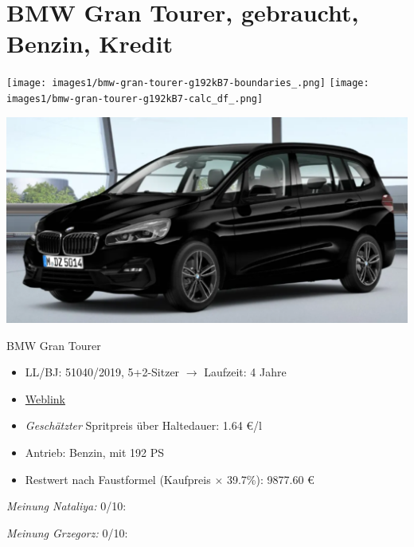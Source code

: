 \documentclass[landscape, DIV=99, 14pt]{scrartcl}
\begin{document}
\pagebreak


\twocolumn

\section*{BMW Gran Tourer, gebraucht, Benzin, Kredit}
\begin{center}
\texttt{[image: images1/bmw-gran-tourer-g192kB7-boundaries\_.png]}
\null
\vspace{0.5cm}
\texttt{[image: images1/bmw-gran-tourer-g192kB7-calc\_df\_.png]}
\end{center}

\pagebreak
\begin{center}
\includegraphics[width=0.9\columnwidth]{cars/bmw-gran-tourer-mulfinger.png}

BMW Gran Tourer
\end{center}

\begin{itemize}
    \item LL/BJ: 51040/2019, 5+2-Sitzer $\rightarrow$ Laufzeit: 4 Jahre
    \item \href{https://mulfinger.de/de/fahrzeugangebot/BMW/220i-GranTourer-Sport-DKG-HUD-LED-ParkAssNavi/page1/details-p5clkem9?manufacturer=5&model=2534&view=list}{Weblink}
    \item \emph{Gesch\"atzter} Spritpreis \"uber Haltedauer: 1.64 \euro{}/l
    \item Antrieb: Benzin, mit 192 PS
    \item Restwert nach Faustformel (Kaufpreis $\times$ 39.7\%): 9877.60 \euro{}
\end{itemize}

\begin{small}
\emph{Meinung Nataliya:} 0/10: 
        
\emph{Meinung Grzegorz:} 0/10: 
\end{small}
\end{document}
